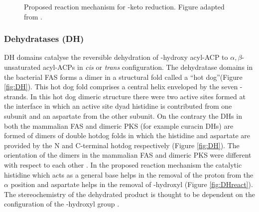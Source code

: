 			\setlength\fboxsep{5pt}
			\setlength\fboxrule{1.5pt}
			\begin{figure} []
			\centering
			\caption[Proposed reaction mechanism for \bet-keto reduction]{Proposed reaction mechanism for \bet-keto reduction. Figure adapted from \parencite{Reid2003}.}
			\label{fig:KRreact}
			\end{figure}
						
			

			\subsubsection{Dehydratases (DH)}
			\label{sec:DH} 
			DH domains catalyse the reversible dehydration of \bet-hydroxy acyl-ACP to $\alpha,\beta$-unsaturated acyl-ACPs in \textit{cis} or \textit{trans} configuration. The dehydratase domains in the bacterial FAS forms a dimer in a structural fold called a \textquotedblleft hot dog\textquotedblright (Figure \ref{fig:DH}). This hot dog fold comprises a central helix enveloped by the seven \bet-strands. In this hot dog dimeric structure there were two active sites formed at the interface in which an active site dyad histidine is contributed from one subunit and an aspartate from the other subunit. On the contrary the DHs in both the mammalian FAS and dimeric PKS (for example curacin DHs)  are formed of dimers of double hotdog folds in which the histidine and aspartate are provided by the N and C-terminal hotdog respectively (Figure \ref{fig:DH}). The orientation of the dimers in the mammalian FAS and dimeric PKS were different with respect to each other \parencite{Akey2010}. In the proposed reaction mechanism the catalytic histidine which acts as a general base helps in the removal of the proton from the $\alpha $ position and aspartate helps in the removal of \bet-hydroxyl (Figure \ref{fig:DHreact}). The stereochemistry of the dehydrated product is thought to be dependent on the configuration of the \bet-hydroxyl group \parencite{Keatinge-Clay2006, Maier2008, Akey2010}. 
			
